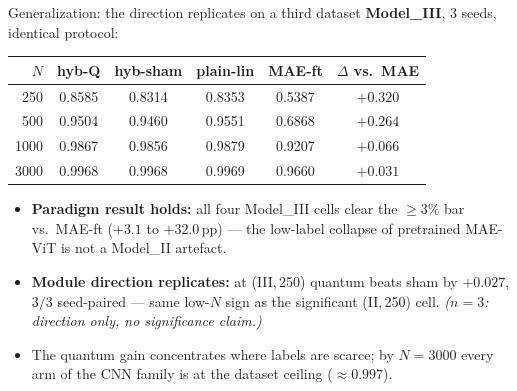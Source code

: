 \documentclass[aspectratio=169,10pt]{beamer}
\newcommand{\gd}[1]{\textcolor{good}{#1}}
\begin{document}
\begin{frame}{Generalization: the direction replicates on a third dataset}
\footnotesize
\textbf{Model\_III}, 3 seeds, identical protocol:

\begin{tabular}{@{}rccccc@{}}
\toprule
$N$ & hyb-Q & hyb-sham & plain-lin & MAE-ft & $\Delta$ vs.\ MAE \\
\midrule
250  & \gd{0.8585} & 0.8314 & 0.8353 & 0.5387 & \gd{$+0.320$} \\
500  & 0.9504 & 0.9460 & \gd{0.9551} & 0.6868 & \gd{$+0.264$} \\
1000 & 0.9867 & 0.9856 & \gd{0.9879} & 0.9207 & \gd{$+0.066$} \\
3000 & 0.9968 & 0.9968 & \gd{0.9969} & 0.9660 & \gd{$+0.031$} \\
\bottomrule
\end{tabular}
\normalsize
\smallskip

\footnotesize
\begin{itemize}
\item \gd{\textbf{Paradigm result holds:}} all four Model\_III cells clear the
      $\geq3\%$ bar vs.\ MAE-ft ($+3.1$ to $+32.0$\,pp) --- the low-label collapse
      of pretrained MAE-ViT is not a Model\_II artefact.
\item \gd{\textbf{Module direction replicates:}} at (III,\,250) quantum beats sham by
      $+0.027$, $3/3$ seed-paired --- same low-$N$ sign as the significant
      (II,\,250) cell. \emph{($n{=}3$: direction only, no significance claim.)}
\item The quantum gain concentrates where labels are scarce; by $N{=}3000$ every
      arm of the CNN family is at the dataset ceiling ($\approx0.997$).
\end{itemize}
\end{frame}
\end{document}

